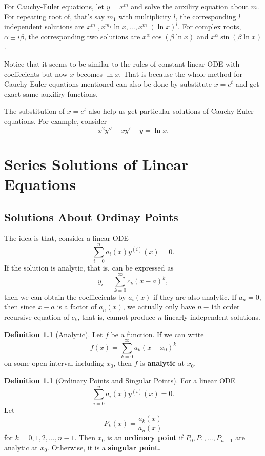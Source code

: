 \documentclass[12pt,a4paper]{report}
\theoremstyle{definition}
\newtheorem{definition}[theorem]{Definition}
\theoremstyle{remark}
\begin{document}
For Cauchy-Euler equations, let $y = x^m$ and solve the auxiliry equation about $m$. For repeating root of, that's say $m_1$ with multiplicity $l$, the corresponding $l$ independent solutions are $x^{m_1}, x^{m_1}\ln x, \ldots, x^{m_1}(\ln x)^l$. For complex roots, $\alpha \pm i\beta$, the corresponding two solutions are $x^\alpha \cos(\beta \ln x)$ and $x^\alpha \sin(\beta \ln x)$.

Notice that it seems to be similar to the rules of constant linear ODE with coeffecients but now $x$ becomes $\ln x$. That is because the whole method for Cauchy-Euler equations mentioned can also be done by substitute $x = e^t$ and get exact same auxiliry functions.

The substitution of $x = e^t$ also help us get particular solutions of Cauchy-Euler equations. For example, consider
\[x^2 y'' - xy' + y = \ln x.\]


\chapter{Series Solutions of Linear Equations}

\section{Solutions About Ordinay Points}

The idea is that, consider a linear ODE
\[\sum_{i = 0}^{n} a_i(x)y^{(i)}(x) = 0.\]
If the solution is analytic, that is, can be expressed as
\[y_i = \sum_{k = 0}^{\infty} c_k (x - a)^k,\]
then we can obtain the coeffiecients by $a_i(x)$ if they are also analytic. If $a_n = 0,$ then since $x - a$ is a factor of $a_n(x)$, we actually only have $n - 1$th order recursive equation of $c_k$, that is, cannot produce $n$ linearly independent solutions.

\begin{definition}[Analytic]
    Let $f$ be a function. If we can write
    \[f(x) = \sum_{k = 0}^{\infty} a_k(x - x_0)^k\]
    on some open interval including $x_0$, then $f$ is \textbf{analytic} at $x_0$.
\end{definition}

\begin{definition}[Ordinary Points and Singular Points]
    For a linear ODE
    \[\sum_{i = 0}^{n} a_i(x)y^{(i)}(x) = 0.\]
    Let
    \[P_k(x) = \frac{a_k(x)}{a_n(x)}\]
    for $k = 0, 1, 2, \ldots, n - 1.$ Then $x_0$ is an \textbf{ordinary point} if $P_0, P_1, \ldots, P_{n - 1}$ are analytic at $x_0$. Otherwise, it is a \textbf{singular point.}
\end{definition}
\end{document}
